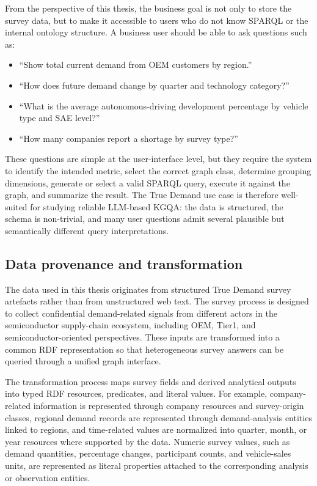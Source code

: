 From the perspective of this thesis, the business goal is not only to store the survey data, but to make it accessible to users who do not know SPARQL or the internal ontology structure. A business user should be able to ask questions such as:

\begin{itemize}
    \item ``Show total current demand from OEM customers by region.''
    \item ``How does future demand change by quarter and technology category?''
    \item ``What is the average autonomous-driving development percentage by vehicle type and SAE level?''
    \item ``How many companies report a shortage by survey type?''
\end{itemize}

These questions are simple at the user-interface level, but they require the system to identify the intended metric, select the correct graph class, determine grouping dimensions, generate or select a valid SPARQL query, execute it against the graph, and summarize the result. The True Demand use case is therefore well-suited for studying reliable LLM-based KGQA: the data is structured, the schema is non-trivial, and many user questions admit several plausible but semantically different query interpretations.

\subsection{Data provenance and transformation}
\label{subsec:data-provenance-transformation}

The data used in this thesis originates from structured True Demand survey artefacts rather than from unstructured web text. The survey process is designed to collect confidential demand-related signals from different actors in the semiconductor supply-chain ecosystem, including OEM, Tier1, and semiconductor-oriented perspectives. These inputs are transformed into a common RDF representation so that heterogeneous survey answers can be queried through a unified graph interface.

The transformation process maps survey fields and derived analytical outputs into typed RDF resources, predicates, and literal values. For example, company-related information is represented through company resources and survey-origin classes, regional demand records are represented through demand-analysis entities linked to regions, and time-related values are normalized into quarter, month, or year resources where supported by the data. Numeric survey values, such as demand quantities, percentage changes, participant counts, and vehicle-sales units, are represented as literal properties attached to the corresponding analysis or observation entities.

